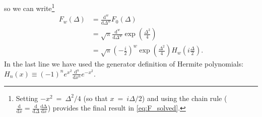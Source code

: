 \documentclass[aip, jcp, reprint, onecolumn, nofootinbib]{revtex4-2}
\begin{document}
so we can write\footnote{Setting $-x^2 \ = \ \Delta^2/4$ (so that $x \ = \ i \Delta /2$) and using the chain rule ($\frac{\mathrm{d}}{\mathrm{d}x} =  \frac{\mathrm{d}}{\mathrm{d}\Delta}  \frac{\mathrm{d\Delta}}{\mathrm{d}x}$) provides the final result in \autoref{eq:F_solved}.}
\begin{equation}\label{eq:F_solved}
	\begin{split}
		F_w(\Delta) &= \frac{\mathrm{d}^w}{\mathrm{d}\Delta^w} F_0(\Delta) \\
		&= \sqrt{\pi} \frac{\mathrm{d}^w}{\mathrm{d}\Delta^w} \exp(\frac{\Delta^2}{4}) \\
		&= \sqrt{\pi} \left( -\frac{i}{2} \right)^w \exp(\frac{\Delta^2}{4}) H_w\left(i\frac{\Delta}{2}\right).
	\end{split}
\end{equation}
In the last line we have used the generator definition of Hermite polynomials:  $H_n(x) \equiv (-1)^n e^{x^2} \frac{\mathrm{d}^n}{\mathrm{d}x^n} e^{-x^2}$.\cite{MorseFeshbach}
\end{document}
